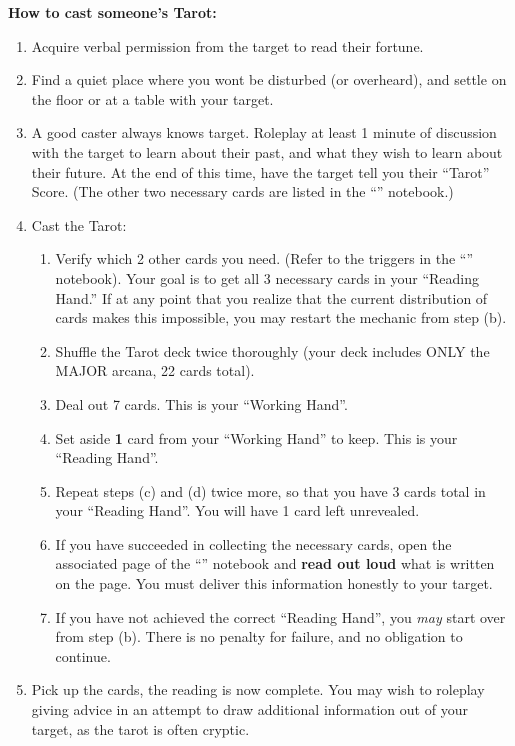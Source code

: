 \documentclass[green]{NeptuneBall}
\begin{document}
{\bf How to cast someone's Tarot:}
\begin{enumerate}
  \item Acquire verbal permission from the target to read their fortune.
  \item Find a quiet place where you wont be disturbed (or overheard), and settle on the floor or at a table with your target.
  \item A good caster always knows \cSlave{\their} target. Roleplay at least 1 minute of discussion with the target to learn about their past, and what they wish to learn about their future. At the end of this time, have the target tell you their ``Tarot'' Score. (The other two necessary cards are listed in the ``\mTarot{\MYname}'' notebook.)
  \item Cast the Tarot:
  \begin{enumerate}
    \item Verify which 2 other cards you need. (Refer to the triggers in the ``\mTarot{\MYname}'' notebook). Your goal is to get all 3 necessary cards in your ``Reading Hand.'' If at any point that you realize that the current distribution of cards makes this impossible, you may restart the mechanic from step (b).
    \item Shuffle the Tarot deck twice thoroughly (your deck includes ONLY the MAJOR arcana, 22 cards total).
    \item Deal out 7 cards. This is your ``Working Hand''. 
    \item Set aside {\bf 1} card from your ``Working Hand'' to keep. This is your ``Reading Hand''.
    \item Repeat steps (c) and (d) twice more, so that you have 3 cards total in your ``Reading Hand''. You will have 1 card left unrevealed.
    \item If you have succeeded in collecting the necessary cards, open the associated page of the ``\mTarot{\MYname}'' notebook and {\bf read out loud} what is written on the page. You must deliver this information honestly to your target.
    \item If you have not achieved the correct ``Reading Hand'', you \emph{may} start over from step (b). There is no penalty for failure, and no obligation to continue.
  \end{enumerate}
  \item Pick up the cards, the reading is now complete. You may wish to roleplay giving advice in an attempt to draw additional information out of your target, as the tarot is often cryptic.
\end{enumerate}
\end{document}
